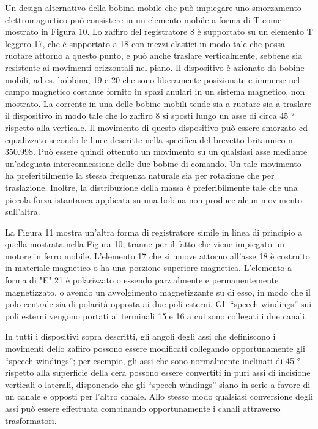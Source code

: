 \documentclass[11pt]{article}
\begin{document}
\begin{multicols*}{2}
Un design alternativo della bobina mobile che può impiegare uno smorzamento elettromagnetico può consistere in un elemento mobile a forma di T come mostrato in Figura 10. Lo zaffiro del registratore 8 è supportato su un elemento T leggero 17, che è supportato a 18 con mezzi elastici in modo tale che possa ruotare attorno a questo punto, e può anche traslare verticalmente, sebbene sia resistente ai movimenti orizzontali nel piano. Il dispositivo è azionato da bobine mobili, ad es. bobbina, 19 e 20 che sono liberamente posizionate e immerse nel campo magnetico costante fornito in spazi anulari in un sistema magnetico, non mostrato. La corrente in una delle bobine mobili tende sia a ruotare sia a traslare il dispositivo in modo tale che lo zaffiro 8 si sposti lungo un asse di circa 45 ° rispetto alla verticale. Il movimento di questo dispositivo può essere smorzato ed equalizzato secondo le linee descritte nella specifica del brevetto britannico n. 350.998. Può essere quindi ottenuto un movimento su un qualsiasi asse mediante un'adeguata interconnessione delle due bobine di comando. Un tale movimento ha preferibilmente la stessa frequenza naturale sia per rotazione che per traslazione. Inoltre, la distribuzione della massa è preferibilmente tale che una piccola forza istantanea applicata su una bobina non produce alcun movimento sull’altra.

La Figura 11 mostra un'altra forma di registratore simile in linea di principio a quella mostrata nella Figura 10, tranne per il fatto che viene impiegato un motore in ferro mobile. L'elemento 17 che si muove attorno all'asse 18 è costruito in materiale magnetico o ha una porzione superiore magnetica. L'elemento a forma di "E" 21 è polarizzato o essendo parzialmente e permanentemente magnetizzato, o avendo un avvolgimento magnetizzante su di esso, in modo che il polo centrale sia di polarità opposta ai due poli esterni. Gli “speech windings” sui poli esterni vengono portati ai terminali 15 e 16 a cui sono collegati i due canali.

In tutti i dispositivi sopra descritti, gli angoli degli assi che definiscono i movimenti dello zaffiro possono essere modificati collegando opportunamente gli “speech windings”; per esempio, gli assi che sono normalmente inclinati di 45 ° rispetto alla superficie della cera possono essere convertiti in puri assi di incisione verticali o laterali, disponendo che gli “speech windings” siano in serie a favore di un canale e opposti per l'altro canale. Allo stesso modo qualsiasi conversione degli assi può essere effettuata combinando opportunamente i canali attraverso trasformatori.


\end{multicols*}
\end{document}
